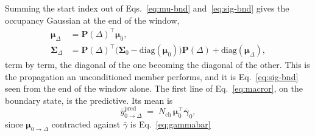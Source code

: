 \begin{appendixbox}
Summing the start index out of Eqs.~\ref{eq:mu-bnd} and~\ref{eq:sig-bnd} gives the occupancy
Gaussian at the end of the window,
\begin{align}
  \boldsymbol{\mu}_\Delta &= \mathbf{P}(\Delta)^\top \boldsymbol{\mu}_0, \label{eq:mu-prop}\\
  \boldsymbol{\Sigma}_\Delta &= \mathbf{P}(\Delta)^\top\bigl(\boldsymbol{\Sigma}_0-\mathrm{diag}(\boldsymbol{\mu}_0)\bigr)\mathbf{P}(\Delta) + \mathrm{diag}(\boldsymbol{\mu}_\Delta), \label{eq:sig-prop}
\end{align}
term by term, the diagonal of the one becoming the diagonal of the other. This is the
propagation an unconditioned member performs, and it is Eq.~\ref{eq:sig-bnd} seen from the end
of the window alone.
The first line of Eq.~\ref{eq:macror}, on the boundary state, is the predictive. Its mean is
\begin{equation}
  \bar{y}^{\mathrm{pred}}_{0\to\Delta} \;=\; N_{\mathrm{ch}}\,\boldsymbol{\mu}_0^\top \bar{\boldsymbol{\gamma}}_0,
  \label{eq:ypred}
\end{equation}
since $\boldsymbol{\mu}_{0\to\Delta}$ contracted against $\bar{\gamma}$ is Eq.~\ref{eq:gammabar}

\end{appendixbox}
